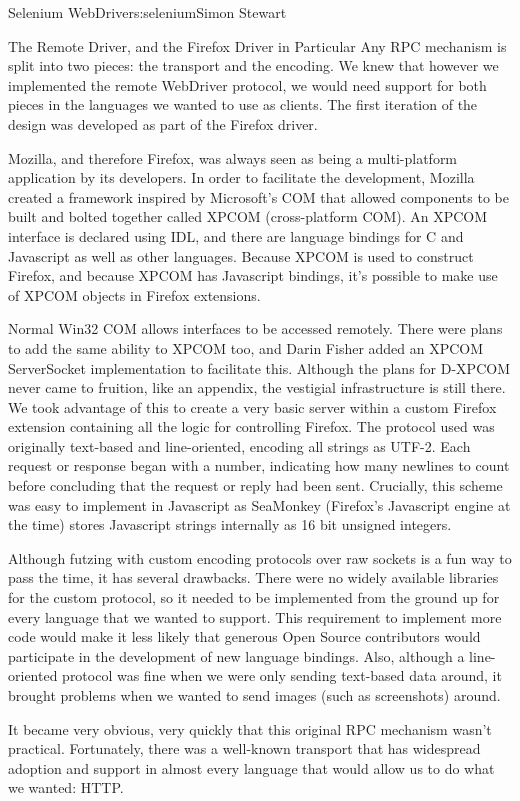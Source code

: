 \begin{aosachapter}{Selenium WebDriver}{s:selenium}{Simon Stewart}
\begin{aosasect1}{The Remote Driver, and the Firefox Driver in Particular}
Any RPC mechanism is split into two pieces: the transport and the
encoding. We knew that however we implemented the remote WebDriver
protocol, we would need support for both pieces in the languages we
wanted to use as clients. The first iteration of the design was
developed as part of the Firefox driver.

Mozilla, and therefore Firefox, was always seen as being a
multi-platform application by its developers. In order to facilitate
the development, Mozilla created a framework inspired by Microsoft's
COM that allowed components to be built and bolted together called
XPCOM (cross-platform COM). An XPCOM interface is declared using IDL,
and there are
language bindings for C and Javascript as well as other languages. Because
XPCOM is used to construct Firefox, and because XPCOM has Javascript
bindings, it's possible to make use of XPCOM objects in Firefox
extensions.

Normal Win32 COM allows interfaces to be accessed remotely. There were
plans to add the same ability to XPCOM too, and Darin Fisher added an
XPCOM ServerSocket implementation to facilitate this. Although the
plans for D-XPCOM never came to fruition, like an appendix, the
vestigial infrastructure is still there.  We took advantage of this to
create a very basic server within a custom Firefox extension
containing all the logic for controlling Firefox. The protocol used
was originally text-based and line-oriented, encoding all strings as
UTF-2. Each request or response began with a number, indicating how
many newlines to count before concluding that the request or reply had
been sent. Crucially, this scheme was easy to implement in Javascript
as SeaMonkey (Firefox's Javascript engine at the time) stores
Javascript strings internally as 16 bit unsigned integers.

Although futzing with custom encoding protocols over raw sockets is a
fun way to pass the time, it has several drawbacks. There were no
widely available libraries for the custom protocol, so it needed to be
implemented from the ground up for every language that we wanted to
support. This requirement to implement more code would make it less
likely that generous Open Source contributors would participate in the
development of new language bindings. Also, although a line-oriented
protocol was fine when we were only sending text-based data around, it
brought problems when we wanted to send images (such as screenshots)
around.

It became very obvious, very quickly that this original RPC mechanism
wasn't practical. Fortunately, there was a well-known transport that
has widespread adoption and support in almost every language that
would allow us to do what we wanted: HTTP.


\end{aosasect1}
\end{aosachapter}

